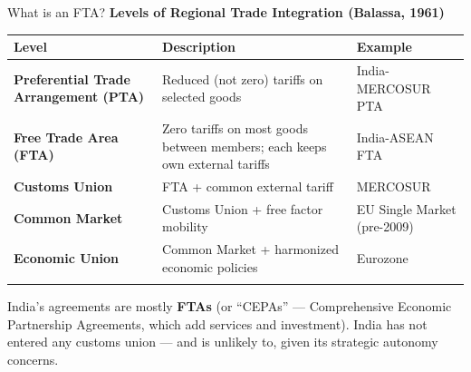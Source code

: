\documentclass[
  ignorenonframetext,
  aspectratio=169,
]{beamer}
\makeatletter
\let\quarto@originallabel\label
\DeclareRobustCommand*{\label}[1]{\quarto@originallabel{#1}}
\makeatother
\begin{document}
\begin{frame}{What is an FTA?}
\label{what-is-an-fta}
\textbf{Levels of Regional Trade Integration (Balassa, 1961)}

\begin{longtable}[]{@{}
  >{\raggedright\arraybackslash}p{}
  >{\raggedright\arraybackslash}p{}
  >{\raggedright\arraybackslash}p{}@{}}
\toprule\noalign{}
\begin{minipage}[b]{\linewidth}\raggedright
Level
\end{minipage} & \begin{minipage}[b]{\linewidth}\raggedright
Description
\end{minipage} & \begin{minipage}[b]{\linewidth}\raggedright
Example
\end{minipage} \\
\midrule\noalign{}
\endhead
\textbf{Preferential Trade Arrangement (PTA)} & Reduced (not zero)
tariffs on selected goods & India-MERCOSUR PTA \\
\textbf{Free Trade Area (FTA)} & Zero tariffs on most goods between
members; each keeps own external tariffs & India-ASEAN FTA \\
\textbf{Customs Union} & FTA + common external tariff & MERCOSUR \\
\textbf{Common Market} & Customs Union + free factor mobility & EU
Single Market (pre-2009) \\
\textbf{Economic Union} & Common Market + harmonized economic policies &
Eurozone \\
\bottomrule\noalign{}
\end{longtable}

India's agreements are mostly \textbf{FTAs} (or ``CEPAs'' ---
Comprehensive Economic Partnership Agreements, which add services and
investment). India has not entered any customs union --- and is unlikely
to, given its strategic autonomy concerns.
\end{frame}
\end{document}
